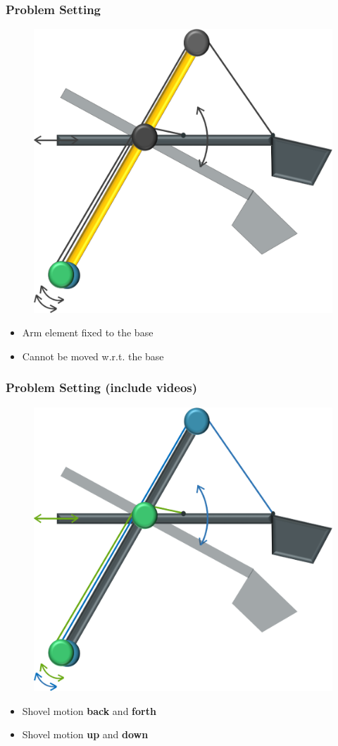 \begin{frame}
	\frametitle{Problem Setting}
	\begin{figure}[bth]
		\centering
		\includegraphics[width=.4\linewidth]{img/Problem_2}
	\end{figure}
	\begin{itemize}
		\item{Arm element fixed to the base}
		\item{Cannot be moved w.r.t. the base}
	\end{itemize}
\end{frame}

\begin{frame}
	\frametitle{Problem Setting (include videos)}
	\begin{figure}[bth]
		\centering
		\includegraphics[width=.4\linewidth]{img/Problem_3}
	\end{figure}
	\centering
	\begin{itemize}
		\item{\makebox[1.5cm][l]{\textcolor[rgb]{0,0.69,0.32}{Green:}} Shovel motion \textbf{back} and \textbf{forth}}
		\item{\makebox[1.5cm][l]{\textcolor[rgb]{0.18,0.46,0.71}{Blue:}} Shovel motion \textbf{up} and \textbf{down}} \\
	\end{itemize}
\end{frame}


